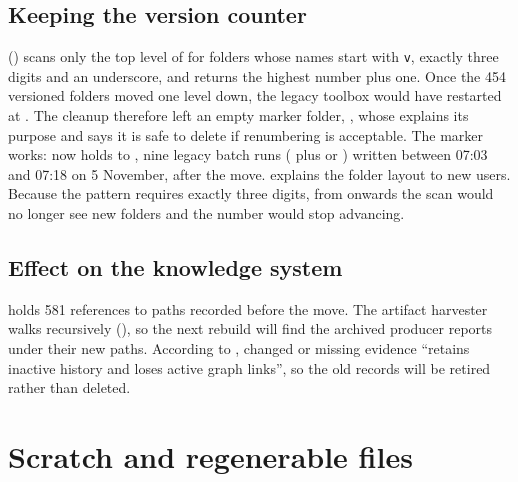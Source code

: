 \subsection{Keeping the version counter}
 () scans only the top level of  for folders whose names start with \texttt{v}, exactly three digits and an underscore, and returns the highest number plus one. Once the 454 versioned folders moved one level down, the legacy toolbox would have restarted at . The cleanup therefore left an empty marker folder, , whose  explains its purpose and says it is safe to delete if renumbering is acceptable. The marker works:  now holds  to , nine legacy batch runs ( plus  or ) written between 07:03 and 07:18 on 5 November, after the move.  explains the folder layout to new users. Because the pattern requires exactly three digits, from  onwards the scan would no longer see new folders and the number would stop advancing.

\subsection{Effect on the knowledge system}
 holds 581 references to  paths recorded before the move. The artifact harvester walks  recursively (), so the next rebuild will find the archived producer reports under their new paths. According to , changed or missing evidence ``retains inactive history and loses active graph links'', so the old records will be retired rather than deleted.

\section{Scratch and regenerable files}\label{sec:cl-scratch}

